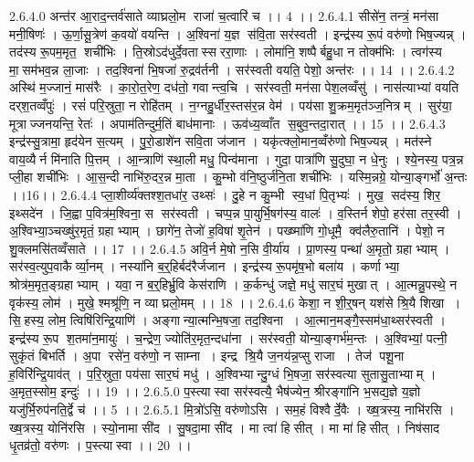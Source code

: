 2.6.4.0
अन्त॑र आ॒राद॒न्तर्व॑साते व्याघ्रलो॒म राजा॑ च॒त्वारि॑ च ।। 4 ।।
2.6.4.1
सीसे॑न॒ तन्त्रं॒ मन॑सा मनी॒षिणः॑ । ऊ॒र्णा॒सू॒त्रेण॑ क॒वयो॑ वयन्ति । अ॒श्विना॑ य॒ज्ञ स॑वि॒ता सर॑स्वती । इन्द्र॑स्य रू॒पं वरु॑णो भिष॒ज्यन्न् । तद॑स्य रू॒पम॒मृत॒॒ शची॑भिः । ति॒स्रोऽद॑धुर्दे॒वतास्सररा॒णाः । लोमा॑नि॒ शष्पैर्बहु॒धा न तोक्म॑भिः । त्वग॑स्य मा॒॒सम॑भव॒न्न ला॒जाः । तद॒श्विना॑ भि॒षजा॑ रु॒द्रव॑र्तनी । सर॑स्वती वयति॒ पेशो॒ अन्त॑रः ।। 14 ।।
2.6.4.2
अस्थि॑ म॒ज्जानं॒ मास॑रैः । का॒रो॒त॒रेण॒ दध॑तो॒ गवान्त्व॒चि । सर॑स्वती॒ मन॑सा पेश॒लव्वँसु॑ । नास॑त्याभ्यां वयति दर्‌श॒तव्वँपुः॑ । रसं॑ परि॒स्रुता॒ न रोहि॑तम् । न॒ग्नहु॒र्धीर॒स्तस॑र॒न्न वेम॑ । पय॑सा शु॒क्रम॒मृत॑ञ्ज॒नित्रम् । सुर॑या॒ मूत्राज्जनयन्ति॒ रेतः॑ । अपाम॑तिन्दुर्म॒तिं बाध॑मानाः । ऊव॑ध्य॒व्वाँत॑ स॒बुव॒न्तदा॒रात् ।। 15 ।।
2.6.4.3
इन्द्र॑स्सु॒त्रामा॒ हृद॑येन स॒त्यम् । पु॒रो॒डाशे॑न सवि॒ता ज॑जान । यकृ॑त्क्लो॒मान॒व्वँरु॑णो भिष॒ज्यन्न् । मत॑स्ने वाय॒व्यैर्न मि॑नाति पि॒त्तम् । आ॒न्त्राणि॑ स्था॒ली मधु॒ पिन्व॑माना । गुदा॒ पात्रा॑णि सु॒दुघा॒ न धे॒नुः । श्ये॒नस्य॒ पत्र॒न्न प्ली॒हा शची॑भिः । आ॒स॒न्दी नाभि॑रु॒दर॒न्न मा॒ता । कु॒म्भो व॑नि॒ष्ठुर्ज॑नि॒ता शची॑भिः । यस्मि॒न्नग्रे॒ योन्या॒ङ्गर्भो॑ अ॒न्तः ।।16।।
2.6.4.4
प्ला॒शीर्व्य॑क्तश्श॒तधा॑र॒ उथ्सः॑ । दु॒हे न कु॒म्भी स्व॒धां पि॒तृभ्यः॑ । मुख॒॒ सद॑स्य॒ शिर॒ इथ्सदे॑न । जि॒ह्वा प॒वित्र॑म॒श्विना॒ स सर॑स्वती । चप्प॒न्न पा॒युर्भि॒षग॑स्य॒ वालः॑ । व॒स्तिर्न शेपो॒ हर॑सा तर॒स्वी । अ॒श्विभ्या॒ञ्चख्षु॑र॒मृतं॒ ग्रहाभ्याम् । छागे॑न॒ तेजो॑ ह॒विषा॑ शृ॒तेन॑ । पख्ष्मा॑णि गो॒धूमै॒ क्व॑लैरु॒तानि॑ । पेशो॒ न शु॒क्लमसि॑तव्वँसाते ।। 17 ।।
2.6.4.5
अवि॒र्न मे॒षो न॒सि वी॒र्या॑य । प्रा॒णस्य॒ पन्था॑ अ॒मृतो॒ ग्रहाभ्याम् । सर॑स्व॒त्युप॒वाकैर्व्या॒नम् । नस्या॑नि ब॒र्॒हिर्बद॑रैर्जजान । इन्द्र॑स्य रू॒पमृ॑ष॒भो बला॑य । कर्णाभ्या॒ श्रोत्र॑म॒मृत॒ङ्ग्रहाभ्याम् । यवा॒ न ब॒र्॒हिर्भ्रु॒वि केस॑राणि । क॒र्कन्धु॑ जज्ञे॒ मधु॑ सार॒घं मुखात् । आ॒त्मन्नु॒पस्थे॒ न वृक॑स्य॒ लोम॑ । मुखे॒ श्मश्रू॑णि॒ न व्याघ्रलो॒मम् ।। 18 ।।
2.6.4.6
केशा॒ न शी॒र्॒षन्‌ यश॑से श्रि॒यै शिखा । सि॒॒हस्य॒ लोम॒ त्विषि॑रिन्द्रि॒याणि॑ । अङ्गान्या॒त्मन्भि॒षजा॒ तद॒श्विना । आ॒त्मान॒मङ्गै॒स्सम॑धा॒थ्सर॑स्वती । इन्द्र॑स्य रू॒प श॒तमा॑न॒मायुः॑ । च॒न्द्रेण॒ ज्योति॑र॒मृत॒न्दधा॑ना । सर॑स्वती॒ योन्या॒ङ्गर्भ॑म॒न्तः । अ॒श्विभ्यां॒ पत्नी॒ सुकृ॑तं बिभर्ति । अ॒पा रसे॑न॒ वरु॑णो॒ न साम्ना । इन्द्र॑ श्रि॒यै ज॒नय॑न्न॒प्सु राजा । तेज॑ पशू॒ना ह॒विरि॑न्द्रि॒याव॑त् । प॒रि॒स्रुता॒ पय॑सा सार॒घं मधु॑ । अ॒श्विभ्यान्दु॒ग्धं भि॒षजा॒ सर॑स्वत्या सुतासु॒ताभ्याम् । अ॒मृत॒स्सोम॒ इन्दुः॑ ।। 19 ।।
2.6.5.0
प॒स्त्यास्वा सर॑स्वत्यै॒ भैष॑ज्येन॒ श्रीरङ्गा॑नि भ॒सद्य॒ज्ञे य॒ज्ञो यजु॑र्भि॒रुप॑नति॒र्द्वे च॑ ।। 5 ।।
2.6.5.1
मि॒त्रो॑ऽसि॒ वरु॑णोऽसि । सम॒हं विश्वैर्दे॒वैः । ख्ष॒त्रस्य॒ नाभि॑रसि । ख्ष॒त्रस्य॒ योनि॑रसि । स्यो॒नामा सी॑द । सु॒षदा॒मा सी॑द । मा त्वा॑ हिसीत् । मा मा॑ हिसीत् । निष॑साद धृ॒तव्र॑तो॒ वरु॑णः । प॒स्त्यास्वा ।। 20 ।।
